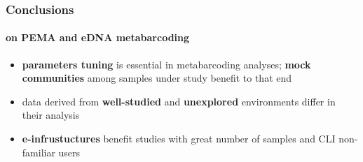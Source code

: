 \documentclass{beamer}
\begin{document}
   \begin{frame}
      \frametitle{Conclusions}
      \framesubtitle{on PEMA and eDNA metabarcoding}

      \begin{itemize}
         \item \textbf{parameters tuning} is essential in metabarcoding analyses;
               \textbf{mock communities} among samples under study benefit to that end
         \item data derived from \textbf{well-studied} and \textbf{unexplored} environments differ in their analysis
         \item \textbf{e-infrustuctures} benefit studies with great number of samples and CLI non-familiar users
      \end{itemize}


   \end{frame}
\end{document}
